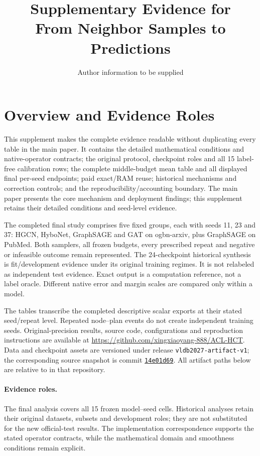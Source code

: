\documentclass[11pt]{article}
\title{Supplementary Evidence for\\From Neighbor Samples to Predictions}
\author{Author information to be supplied}
\date{}
\begin{document}
\maketitle
\section{Overview and Evidence Roles}
This supplement makes the complete evidence readable without duplicating every table in the main paper. It contains the detailed mathematical conditions and native-operator contracts; the original protocol, checkpoint roles and all 15 label-free calibration rows; the complete middle-budget mean table and all displayed final per-seed endpoints; paid exact/RAM reuse; historical mechanisms and correction controls; and the reproducibility/accounting boundary. The main paper presents the core mechanism and deployment findings; this supplement retains their detailed conditions and seed-level evidence.

The completed final study comprises five fixed groups, each with seeds 11, 23 and 37: HGCN, HyboNet, GraphSAGE and GAT on ogbn-arxiv, plus GraphSAGE on PubMed. Both samplers, all frozen budgets, every prescribed repeat and negative or infeasible outcome remain represented. The 24-checkpoint historical synthesis is fit/development evidence under its original training regimes. It is not relabeled as independent test evidence. Exact output is a computation reference, not a label oracle. Different native error and margin scales are compared only within a model.

The tables transcribe the completed descriptive scalar exports at their stated seed/repeat level. Repeated node--plan events do not create independent training seeds. Original-precision results, source code, configurations and reproduction instructions are available at \url{https://github.com/xingxiaoyang-888/ACL-HCT}. Data and checkpoint assets are versioned under release \texttt{vldb2027-artifact-v1}; the corresponding source snapshot is commit \href{https://github.com/xingxiaoyang-888/ACL-HCT/tree/14e01d69dc74d279c644b7afd7c54cccc5350b07}{\texttt{14e01d69}}. All artifact paths below are relative to  in that repository.

\paragraph{Evidence roles.}
The final analysis covers all 15 frozen model--seed cells. Historical analyses retain their original datasets, subsets and development roles; they are not substituted for the new official-test results. The implementation correspondence supports the stated operator contracts, while the mathematical domain and smoothness conditions remain explicit.
\end{document}
